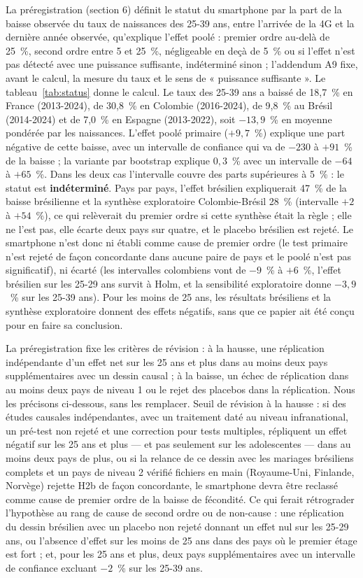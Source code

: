 \documentclass[11pt,a4paper]{article}
\begin{document}
La préregistration (section 6) définit le statut du smartphone par la part de la baisse observée du taux de naissances des 25-39 ans, entre l'arrivée de la 4G et la dernière année observée, qu'explique l'effet poolé : premier ordre au-delà de 25~\%, second ordre entre 5 et 25~\%, négligeable en deçà de 5~\% ou si l'effet n'est pas détecté avec une puissance suffisante, indéterminé sinon ; l'addendum A9 fixe, avant le calcul, la mesure du taux et le sens de « puissance suffisante ». Le tableau~\ref{tab:status} donne le calcul. Le taux des 25-39 ans a baissé de 18,7~\% en France (2013-2024), de 30,8~\% en Colombie (2016-2024), de 9,8~\% au Brésil (2014-2024) et de 7,0~\% en Espagne (2013-2022), soit $-13{,}9$~\% en moyenne pondérée par les naissances. L'effet poolé primaire ($+9{,}7$~\%) explique une part négative de cette baisse, avec un intervalle de confiance qui va de $-230$ à $+91$~\% de la baisse ; la variante par bootstrap explique $0{,}3$~\% avec un intervalle de $-64$ à $+65$~\%. Dans les deux cas l'intervalle couvre des parts supérieures à 5~\% : le statut est \textbf{indéterminé}. Pays par pays, l'effet brésilien expliquerait 47~\% de la baisse brésilienne et la synthèse exploratoire Colombie-Brésil 28~\% (intervalle $+2$ à $+54$~\%), ce qui relèverait du premier ordre si cette synthèse était la règle ; elle ne l'est pas, elle écarte deux pays sur quatre, et le placebo brésilien est rejeté. Le smartphone n'est donc ni établi comme cause de premier ordre (le test primaire n'est rejeté de façon concordante dans aucune paire de pays et le poolé n'est pas significatif), ni écarté (les intervalles colombiens vont de $-9$~\% à $+6$~\%, l'effet brésilien sur les 25-29 ans survit à Holm, et la sensibilité exploratoire donne $-3{,}9$~\% sur les 25-39 ans). Pour les moins de 25 ans, les résultats brésiliens et la synthèse exploratoire donnent des effets négatifs, sans que ce papier ait été conçu pour en faire sa conclusion.

La préregistration fixe les critères de révision : à la hausse, une réplication indépendante d'un effet net sur les 25 ans et plus dans au moins deux pays supplémentaires avec un dessin causal ; à la baisse, un échec de réplication dans au moins deux pays de niveau 1 ou le rejet des placebos dans la réplication. Nous les précisons ci-dessous, sans les remplacer. Seuil de révision à la hausse : si des études causales indépendantes, avec un traitement daté au niveau infranational, un pré-test non rejeté et une correction pour tests multiples, répliquent un effet négatif sur les 25 ans et plus — et pas seulement sur les adolescentes — dans au moins deux pays de plus, ou si la relance de ce dessin avec les mariages brésiliens complets et un pays de niveau 2 vérifié fichiers en main (Royaume-Uni, Finlande, Norvège) rejette H2b de façon concordante, le smartphone devra être reclassé comme cause de premier ordre de la baisse de fécondité. Ce qui ferait rétrograder l'hypothèse au rang de cause de second ordre ou de non-cause : une réplication du dessin brésilien avec un placebo non rejeté donnant un effet nul sur les 25-29 ans, ou l'absence d'effet sur les moins de 25 ans dans des pays où le premier étage est fort ; et, pour les 25 ans et plus, deux pays supplémentaires avec un intervalle de confiance excluant $-2$~\% sur les 25-39 ans.
\end{document}
